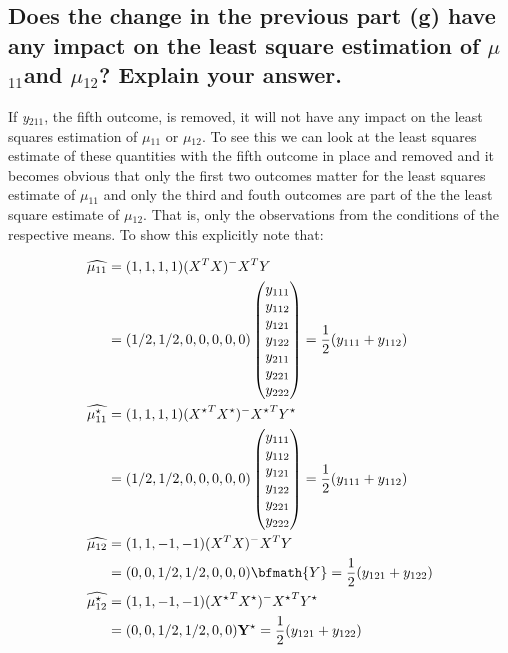 \documentclass[11pt]{article}
\begin{document}
\subsection{Does the change in the previous part (g) have any impact on the least square estimation of $\mu$$_{\mathrm{11}}$and $\mu$$_{\mathrm{12}}$? Explain your answer.}
\label{sec-2-8}


If \emph{y$_{\mathrm{211}}$}, the fifth outcome, is removed, it will not have any
impact on the least squares estimation of $\mu$$_{\mathrm{11}}$ or $\mu$$_{\mathrm{12}}$. To
see this we can look at the least squares estimate of these
quantities with the fifth outcome in place and removed and it becomes
obvious that only the first two outcomes matter for the least squares
estimate of $\mu$$_{\mathrm{11}}$ and only the third and fouth outcomes are part
of the the least square estimate of $\mu$$_{\mathrm{12}}$. That is, only the
observations from the conditions of the respective means. To show
this explicitly note that:

\begin{align*}
\widehat{\mu_{11}} &=(1,1,1,1)(X^TX)^-X^TY\\
             &=(  1/2,1/2,0,0,0,0,0)\begin{pmatrix} y_{111} \\ y_{112} \\ y_{121} \\ y_{122} \\ y_{211} \\ y_{221} \\ y_{222} \end{pmatrix} = \frac{1}{2} (y_{111} + y_{112}) \\
\widehat{\mu^{\star}_{11}} &=(1,1,1,1)({X^{\star}}^TX^{\star})^-{X^{\star}}^TY^{\star}\\
             &=(  1/2,1/2,0,0,0,0,0) \begin{pmatrix} y_{111} \\ y_{112} \\ y_{121} \\ y_{122} \\ y_{221} \\ y_{222} \end{pmatrix} = \frac{1}{2} (y_{111} + y_{112})\\
\widehat{\mu_{12}} &=(1,1,-1,-1)(X^TX)^-X^TY\\
             &=(0,0,  1/2,1/2,0,0,0)\bfmath{Y}  = \frac{1}{2} (y_{121} + y_{122})\\
\widehat{\mu^{\star}_{12}} &=(1,1,-1,-1)({X^{\star}}^TX^{\star})^-{X^{\star}}^TY^{\star}\\
             &=(0,0,  1/2,1/2,0,0)\mathbf{Y^{\star}}  = \frac{1}{2} (y_{121} + y_{122})
\end{align*}
\end{document}

